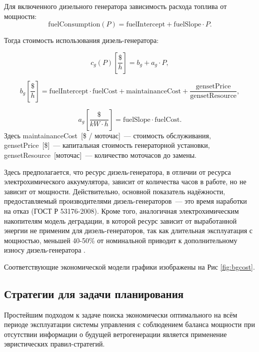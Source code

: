     
Для включенного дизельного генератора зависимость расхода топлива от мощности:
\begin{equation}
 \text{fuelConsumption} (P) = \text{fuelIntercept} + \text{fuelSlope} \cdot P.
\end{equation}

Тогда стоимость использования дизель-генератора:

\begin{equation}\label{f:cg}
c_g(P) \left[\frac{\$}{h} \right] = b_g + a_g \cdot P,
\end{equation}


\begin{equation}\label{f:bg}
b_g \left[\frac{\$}{h} \right] = 
\text{fuelIntercept} \cdot \text{fuelCost} + \text{maintainanceCost} +
\frac{\text{gensetPrice}}{\text{gensetResource}},
\end{equation}

\begin{equation}\label{f:ag}
a_g \left[ \frac{\$}{kW\cdot h} \right] = 
\text{fuelSlope} \cdot \text{fuelCost}.
\end{equation}
Здесь maintainanceCost~[\$ / моточас]~--- стоимость обслуживания,\\ 
gensetPrice~[\$]~--- капитальная стоимость генераторной установки,\\
gensetResource~[моточас]~--- количество моточасов до замены.

Здесь предполагается, что ресурс дизель-генератора, в отличии от ресурса электрохимического аккумулятора, зависит от количества часов в работе, но не зависит от мощности.
Действительно, основной показатель надёжности, предоставляемый производителями дизель-генераторов~--- это время наработки на отказ   (ГОСТ Р 53176-2008). 
Кроме того, аналогичная электрохимическим накопителям модель деградации, в которой ресурс зависит от выработанной энергии не применим для дизель-генераторов, так как длительная эксплуатация с мощностью, меньшей 40-50\% от номинальной приводит к дополнительному износу дизель-генератора \cite{bleijs1993wear}.


Соответствующие экономической модели графики изображены на Рис \ref{fig:bgcost}.

\subsection{Стратегии для задачи планирования}
\label{sec:strategies}

Простейшим подходом к задаче поиска экономически оптимального на всём периоде эксплуатации системы управления с соблюдением баланса мощности при отсутствии информации о будущей ветрогенерации является применение эвристических правил-стратегий.

